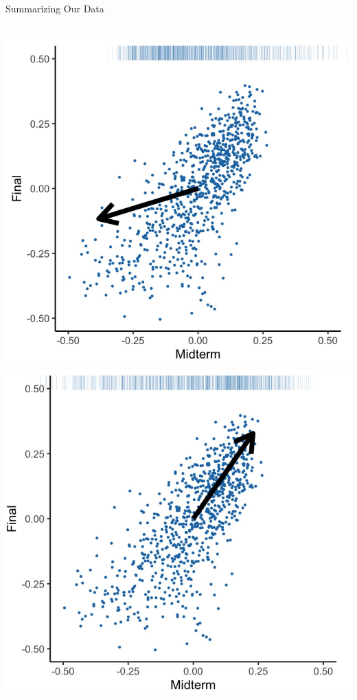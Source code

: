 \documentclass[aspectratio=169]{../latex_main/tntbeamer}  %
\begin{document}
\begin{frame}{Summarizing Our Data}
\begin{columns}
\begin{column}{.5\textwidth}
	                    \includegraphics[scale=.1]{vect3}
	                    \includegraphics[scale=.1]{vect4}
	        \end{column}
	    \end{columns}
	\end{frame}
	
\end{document}

